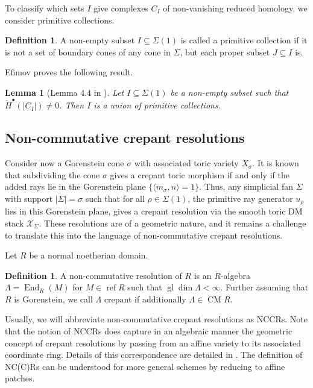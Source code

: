 \documentclass[reqno, 12pt]{amsart}
\newtheorem{lemma}[theorem]{Lemma}
\theoremstyle{definition}
\newtheorem{definition}[theorem]{Definition}
\numberwithin{equation}{section}
\newcommand{\newterm}{\textsf}
\newcommand{\End}{\operatorname{End}}
\newcommand{\gldim}{\operatorname{gl}\dim}
\begin{document}
To classify which sets $I$ give complexes $C_I$ of non-vanishing reduced homology, we consider \newterm{primitive collections}.
\begin{definition}
    \label{Def:PrimColln}
    A non-empty subset $I\subseteq \Sigma(1)$ is called a \newterm{primitive collection} if it is not a set of boundary cones of any cone in $\Sigma$, but each proper subset $J\subseteq I$ is.
\end{definition}

\noindent Efimov \cite{Efimov14} proves the following result.
\begin{lemma}[Lemma 4.4 in \cite{Efimov14}]
    \label{Lem:RedHomUnionofPrim}
    Let $I\subseteq \Sigma(1)$ be a non-empty subset such that $\tilde{H}^{\bullet}(|C_I|)\neq 0$. Then $I$ is a union of primitive collections.
\end{lemma}

\subsection{Non-commutative crepant resolutions}
Consider now a Gorenstein cone $\sigma$ with associated toric variety $X_\sigma$. It is known that subdividing the cone $\sigma$ gives a crepant toric morphism if and only if the added rays lie in the Gorenstein plane $\{\langle m_\sigma,n\rangle=1\}$. Thus, any simplicial fan $\Sigma$ with support $|\Sigma|=\sigma$ such that for all $\rho\in\Sigma(1)$, the primitive ray generator $u_\rho$ lies in this Gorenstein plane, gives a crepant resolution via the smooth toric DM stack $\mathcal{X}_\Sigma$. These resolutions are of a geometric nature, and it remains a challenge to translate this into the language of \newterm{non-commutative crepant resolutions}. 

\noindent Let $R$ be a normal noetherian domain. \begin{definition}
    \label{Def:NCCR}
    A \newterm{non-commutative resolution} of $R$ is an $R$-algebra $\Lambda=\End_R(M)$ for $M\in \operatorname{ref}R$ such that $\gldim\Lambda<\infty$. Further assuming that $R$ is Gorenstein, we call $\Lambda$ \newterm{crepant} if additionally $\Lambda\in \operatorname{CM}R$. 
\end{definition}
Usually, we will abbreviate non-commutative crepant resolutions as NCCRs. 
Note that the notion of NCCRs does capture in an algebraic manner the geometric concept of crepant resolutions by passing from an affine variety to its associated coordinate ring. Details of this correspondence are detailed in \cite[\S 4]{VdB04}. The definition of NC(C)Rs can be understood for more general schemes by reducing to affine patches.
\end{document}
